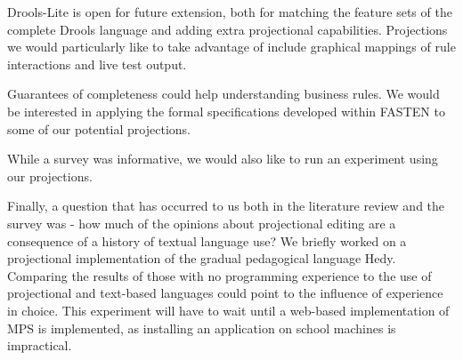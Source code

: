 Drools-Lite is open for future extension, both for matching the feature sets of the complete Drools language and adding extra projectional capabilities.
Projections we would particularly like to take advantage of include graphical mappings of rule interactions and live test output.

Guarantees of completeness could help understanding business rules.
We would be interested in applying the formal specifications developed within FASTEN\cite{ratiu2019fasten} to some of our potential projections.

While a survey was informative, we would also like to run an experiment using our projections.

Finally, a question that has occurred to us both in the literature review and the survey was - how much of the opinions about projectional editing are a consequence of a history of textual language use?
We briefly worked on a projectional implementation of the gradual pedagogical language Hedy\cite{hermans2020hedy}.
Comparing the results of those with no programming experience to the use of projectional and text-based languages could point to the influence of experience in choice.
This experiment will have to wait until a web-based implementation of MPS is implemented, as installing an application on school machines is impractical.
